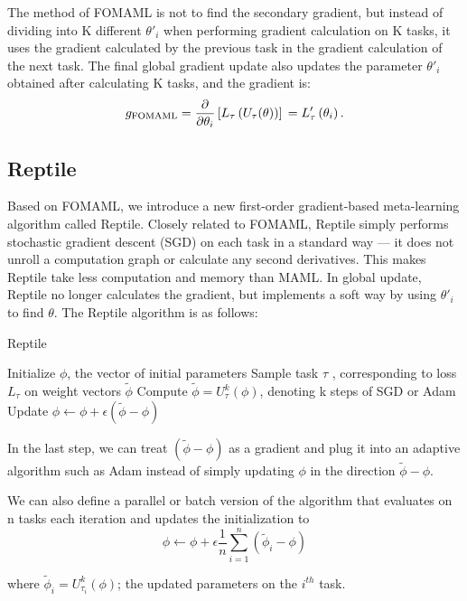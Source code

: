 The method of FOMAML is not to find the secondary gradient, but instead of dividing into K different $\theta'_i$ when performing gradient calculation on K tasks, it uses the gradient calculated by the previous task in the gradient calculation of the next task. The final global gradient update also updates the parameter $\theta'_i$ obtained after calculating K tasks, and the gradient is:
$$
  g_{\mathrm{FOMAML}} =\frac{\partial}{\partial \theta_{i}}\left[L_{\tau}\left(U_{\tau}(\theta)\right)\right] \\
  =L_{\tau}^{\prime}\left(\theta_{i}\right).
$$


\subsection{Reptile}
Based on FOMAML, we introduce a new first-order gradient-based meta-learning algorithm called Reptile. Closely related to FOMAML, Reptile simply performs stochastic gradient descent (SGD) on each task in a standard way — it does not unroll a computation graph or calculate any second derivatives. This makes Reptile take less computation and memory than MAML. In global update, Reptile no longer calculates the gradient, but implements a soft way by using $\theta'_i$ to find $\theta$. The Reptile algorithm is as follows:

\begin{algorithm}[h]
  \caption{Reptile}
  \label{Reptile}
  \begin{algorithmic}[1]
    \STATE Initialize $\phi$, the vector of initial parameters
    \STATE Sample task $\tau$ , corresponding to loss $L_{\tau}$ on weight vectors $\widetilde{\phi} $
    \STATE Compute $\widetilde{\phi}=U_{\tau}^{k}(\phi)$, denoting k steps of SGD or Adam
    \STATE Update $\phi \leftarrow \phi+\epsilon(\widetilde{\phi}-\phi) $
    \ENDFOR
  \end{algorithmic}
\end{algorithm}

In the last step, we can treat $(\widetilde{\phi}-\phi)$ as a gradient and plug it into an adaptive algorithm such as Adam instead of simply updating $\phi$ in the direction $\widetilde{\phi}-\phi$.

We can also define a parallel or batch version of the algorithm that
evaluates on n tasks each iteration and updates the initialization to
$$\phi \leftarrow \phi + \epsilon \frac{1}{n} \sum_{i=1}^{n}\left(\widetilde{\phi}_{i}-\phi\right)$$

where $\widetilde{\phi}_{i}=U_{\tau_{i}}^{k}(\phi)$; the updated parameters on the $i^{th}$ task.

